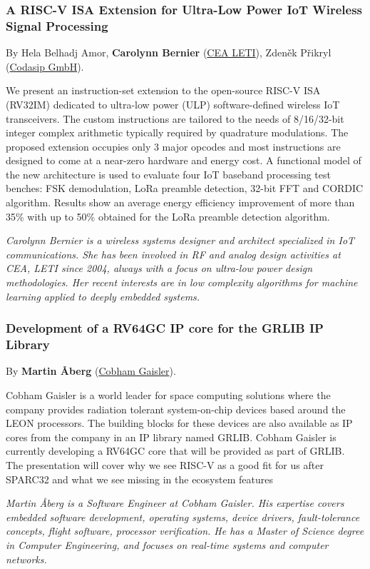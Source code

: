 \documentclass[a4paper, 10pt]{article}
\begin{document}
{\subsubsection{A RISC-V ISA Extension for Ultra-Low Power IoT Wireless Signal Processing}
\label{sec:orgcd043a0}
By Hela Belhadj Amor, \textbf{Carolynn Bernier} (\href{http://www.leti-cea.fr}{CEA
LETI}), Zdeněk Přikryl (\href{http://www.codasip.com}{Codasip GmbH}).

We present an instruction-set extension to the open-source RISC-V ISA
(RV32IM) dedicated to ultra-low power (ULP) software-defined wireless
IoT transceivers. The custom instructions are tailored to the needs of
8/16/32-bit integer complex arithmetic typically required by quadrature
modulations. The proposed extension occupies only 3 major opcodes and
most instructions are designed to come at a near-zero hardware and
energy cost. A functional model of the new architecture is used to
evaluate four IoT baseband processing test benches: FSK demodulation,
LoRa preamble detection, 32-bit FFT and CORDIC algorithm. Results show
an average energy efficiency improvement of more than 35\% with up to 50\%
obtained for the LoRa preamble detection algorithm.

\emph{\footnotesize Carolynn Bernier is a wireless systems designer and architect specialized in IoT communications. She has been involved in RF and analog design activities at CEA, LETI since 2004, always with a focus on ultra-low power design methodologies. Her recent interests are in low complexity algorithms for machine learning applied to deeply embedded systems.}

\subsubsection{Development of a RV64GC IP core for the GRLIB IP Library}
\label{sec:orgd12d66c}
By \textbf{Martin Åberg} (\href{https://www.gaisler.com/}{Cobham Gaisler}).

Cobham Gaisler is a world leader for space computing solutions where the
company provides radiation tolerant system-on-chip devices based around
the LEON processors. The building blocks for these devices are also
available as IP cores from the company in an IP library named GRLIB.
Cobham Gaisler is currently developing a RV64GC core that will be
provided as part of GRLIB. The presentation will cover why we see RISC-V
as a good fit for us after SPARC32 and what we see missing in the
ecosystem features

\emph{\footnotesize Martin Åberg is a Software Engineer at Cobham Gaisler. His expertise covers embedded software development, operating systems, device drivers, fault-tolerance concepts, flight software, processor verification. He has a Master of Science degree in Computer Engineering, and  focuses on real-time systems and computer networks.}


}
\end{document}
